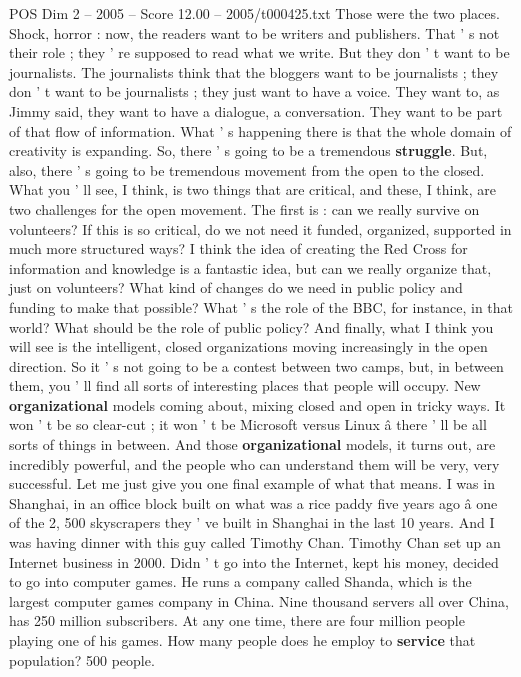 \begin{textsample}{POS Dim 2 – 2005 – Score 12.00 – 2005/t000425.txt}
Those were the two places.
Shock, horror : now, the readers want to be writers and publishers.
That ' s not their role ; they ' re supposed to read what we write.
But they don ' t want to be journalists.
The journalists think that the bloggers want to be journalists ; they don ' t want to be journalists ; they just want to have a voice.
They want to, as Jimmy said, they want to have a dialogue, a conversation.
They want to be part of that flow of information.
What ' s happening there is that the whole domain of creativity is expanding.
So, there ' s going to be a tremendous \textbf{struggle}.
But, also, there ' s going to be tremendous movement from the open to the closed.
What you ' ll see, I think, is two things that are critical, and these, I think, are two challenges for the open movement.
The first is : can we really survive on volunteers?
If this is so critical, do we not need it funded, organized, supported in much more structured ways?
I think the idea of creating the Red Cross for information and knowledge is a fantastic idea, but can we really organize that, just on volunteers?
What kind of changes do we need in public policy and funding to make that possible?
What ' s the role of the BBC, for instance, in that world?
What should be the role of public policy?
And finally, what I think you will see is the intelligent, closed organizations moving increasingly in the open direction.
So it ' s not going to be a contest between two camps, but, in between them, you ' ll find all sorts of interesting places that people will occupy.
New \textbf{organizational} models coming about, mixing closed and open in tricky ways.
It won ' t be so clear-cut ; it won ' t be Microsoft versus Linux â there ' ll be all sorts of things in between.
And those \textbf{organizational} models, it turns out, are incredibly powerful, and the people who can understand them will be very, very successful.
Let me just give you one final example of what that means.
I was in Shanghai, in an office block built on what was a rice paddy five years ago â one of the 2, 500 skyscrapers they ' ve built in Shanghai in the last 10 years.
And I was having dinner with this guy called Timothy Chan.
Timothy Chan set up an Internet business in 2000.
Didn ' t go into the Internet, kept his money, decided to go into computer games.
He runs a company called Shanda, which is the largest computer games company in China.
Nine thousand servers all over China, has 250 million subscribers.
At any one time, there are four million people playing one of his games.
How many people does he employ to \textbf{service} that population? 500 people.

\end{textsample}
